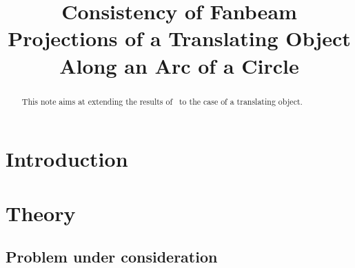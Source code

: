 \documentclass[a4paper]{article}
\title{Consistency of Fanbeam Projections of a Translating Object Along an Arc of a Circle}
\author{}
\date{}
\numberwithin{equation}{section}
\begin{document}
\maketitle

\begin{abstract}
This note aims at extending the results of~\cite{clackdoyle2015consistency} to the case of a translating object.
\end{abstract}

\section{Introduction}

\section{Theory} 
\label{sec:theory}

\subsection{Problem under consideration}
\label{sub:problem_under_consideration}
\end{document}
